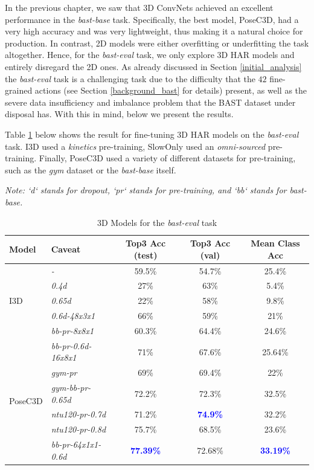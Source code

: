 \documentclass[extern,palatino]{cgMA}
\begin{document}
\bigskip
\noindent In the previous chapter, we saw that 3D ConvNets achieved an excellent performance in the \textit{bast-base} task. Specifically, the best model, PoseC3D, had a very high accuracy and was very lightweight, thus making it a natural choice for production. In contrast, 2D models were either overfitting or underfitting the task altogether. Hence, for the \textit{bast-eval} task, we only explore 3D HAR models and entirely disregard the 2D ones. As already discussed in Section \ref{initial_analysis} the \textit{bast-eval} task is a challenging task due to the difficulty that the $42$ fine-grained actions (see Section \ref{background_bast} for details) present, as well as the severe data insufficiency and imbalance problem that the BAST dataset under disposal has. With this in mind, below we present the results.

Table \ref{tab:research_question_2_3d_models} below shows the result for fine-tuning 3D HAR models on the \textit{bast-eval} task. I3D used a \textit{kinetics} pre-training, SlowOnly used an \textit{omni-sourced} pre-training. Finally, PoseC3D used a variety of different datasets for pre-training, such as the \textit{gym} dataset or the \textit{bast-base} itself.

\bigskip
\noindent\textit{Note: `d` stands for dropout, `pr` stands for pre-training, and `bb` stands for bast-base.}

\bigskip
\begin{table}[h!]
  \begin{center}
    \caption{3D Models for the \textit{bast-eval} task}
    \label{tab:research_question_2_3d_models}
    \begin{tabular}{l|l|c|c|c}
      \textbf{Model} & \textbf{Caveat} & \textbf{Top3 Acc (test)} & \textbf{Top3 Acc (val)} & \textbf{Mean Class Acc}\\
      \hline
      \multirow{5}{*}{I3D} & \textit{-} & 59.5\% & 54.7\% & 25.4\%\\
      & \textit{0.4d}& 27\% & 63\% & 5.4\%\\
      & \textit{0.65d}& 22\% & 58\% & 9.8\%\\
      & \textit{0.6d-48x3x1}& 66\% & 59\% & 21\%\\
      \hline
      \multirow{2}{*}{SlowOnly} & \textit{bb-pr-8x8x1} & 60.3\% & 64.4\% & 24.6\%\\
      & \textit{bb-pr-0.6d-16x8x1} & 71\% & 67.6\% & 25.64\%\\
      \hline
      \multirow{4}{*}{PoseC3D} & \textit{gym-pr} & 69\% & 69.4\% & 22\%\\
      & \textit{gym-bb-pr-0.65d}& 72.2\% & 72.3\% & 32.5\%\\
      & \textit{ntu120-pr-0.7d}& 71.2\% & \textcolor{blue}{\textbf{74.9\%}} & 32.2\%\\
      & \textit{ntu120-pr-0.8d}& 75.7\% & 68.5\% & 23.6\%\\
      & \textit{bb-pr-64x1x1-0.6d}& \textcolor{blue}{\textbf{77.39\%}} & 72.68\% & \textcolor{blue}{\textbf{33.19\%}}\\
    \end{tabular}
  \end{center}
\end{table}
\end{document}
